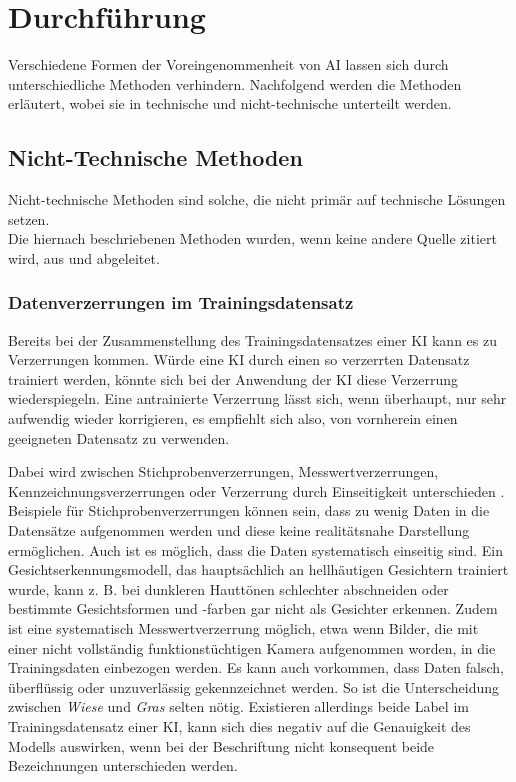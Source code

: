 \documentclass[12pt]{report}
\begin{document}
\chapter{Durchführung}\label{execution}
Verschiedene Formen der Voreingenommenheit von AI lassen sich durch unterschiedliche Methoden verhindern. Nachfolgend werden die Methoden erläutert, wobei sie in technische und nicht-technische unterteilt werden.

\section{Nicht-Technische Methoden}
Nicht-technische Methoden sind solche, die nicht primär auf technische Lösungen setzen.\\
Die hiernach beschriebenen Methoden wurden, wenn keine andere Quelle zitiert wird, aus \cite{UNESCO} und \cite{EUCommision} abgeleitet. %

\subsection{Datenverzerrungen im Trainingsdatensatz}
Bereits bei der Zusammenstellung des Trainingsdatensatzes einer KI kann es zu Verzerrungen kommen. Würde eine KI durch einen so verzerrten Datensatz trainiert werden, könnte sich bei der Anwendung der KI diese Verzerrung wiederspiegeln. Eine antrainierte Verzerrung lässt sich, wenn überhaupt, nur sehr aufwendig wieder korrigieren, es empfiehlt sich also, von vornherein einen geeigneten Datensatz zu verwenden.

Dabei wird zwischen Stichprobenverzerrungen, Messwertverzerrungen, Kennzeichnungsverzerrungen oder Verzerrung durch Einseitigkeit unterschieden \cite[S. 48ff.]{Srinivasan}.
Beispiele für Stichprobenverzerrungen können sein, dass zu wenig Daten in die Datensätze aufgenommen werden und diese keine realitätsnahe Darstellung ermöglichen.
Auch ist es möglich, dass die Daten systematisch einseitig sind. Ein Gesichtserkennungsmodell, das hauptsächlich an hellhäutigen Gesichtern trainiert wurde, kann z. B. bei dunkleren Hauttönen schlechter abschneiden oder bestimmte Gesichtsformen und -farben gar nicht als Gesichter erkennen.
Zudem ist eine systematisch Messwertverzerrung möglich, etwa wenn Bilder, die mit einer nicht vollständig funktionstüchtigen Kamera aufgenommen worden, in die Trainingsdaten einbezogen werden.
Es kann auch vorkommen, dass Daten falsch, überflüssig oder unzuverlässig gekennzeichnet werden. So ist die Unterscheidung zwischen \textit{Wiese} und \textit{Gras} selten nötig. Existieren allerdings beide Label im Trainingsdatensatz einer KI, kann sich dies negativ auf die Genauigkeit des Modells auswirken, wenn bei der Beschriftung nicht konsequent beide Bezeichnungen unterschieden werden\cite[S. 48ff.]{Srinivasan}. 
\end{document}
